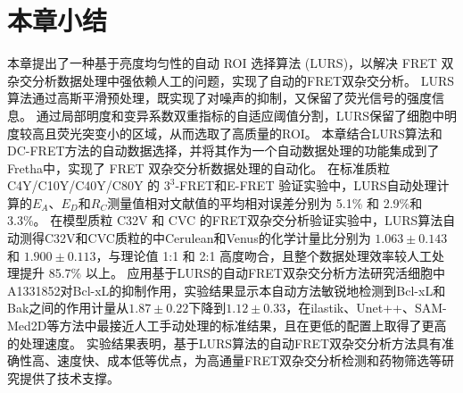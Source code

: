 \section{本章小结}
本章提出了一种基于亮度均匀性的自动 ROI 选择算法 (LURS)，以解决 FRET 双杂交分析数据处理中强依赖人工的问题，实现了自动的FRET双杂交分析。
LURS算法通过高斯平滑预处理，既实现了对噪声的抑制，又保留了荧光信号的强度信息。
通过局部明度和变异系数双重指标的自适应阈值分割，LURS保留了细胞中明度较高且荧光突变小的区域，从而选取了高质量的ROI。
本章结合LURS算法和DC-FRET方法的自动数据选择，并将其作为一个自动数据处理的功能集成到了Fretha中，实现了 FRET 双杂交分析数据处理的自动化。
在标准质粒 C4Y/C10Y/C40Y/C80Y 的 $3^3$-FRET和E-FRET 验证实验中，LURS自动处理计算的$E_A$、$E_D$和$R_C$测量值相对文献值的平均相对误差分别为 5.1\% 和 2.9\%和3.3\%。
在模型质粒 C32V 和 CVC 的FRET双杂交分析验证实验中，LURS算法自动测得C32V和CVC质粒的中Cerulean和Venus的化学计量比分别为 $1.063 \pm 0.143$ 和 $1.900 \pm 0.113$，与理论值 1:1 和 2:1 高度吻合，且整个数据处理效率较人工处理提升 85.7\% 以上。
应用基于LURS的自动FRET双杂交分析方法研究活细胞中A1331852对Bcl-xL的抑制作用，实验结果显示本自动方法敏锐地检测到Bcl-xL和Bak之间的作用计量从$1.87 \pm 0.22$下降到$1.12 \pm 0.33$，在ilastik、Unet++、SAM-Med2D等方法中最接近人工手动处理的标准结果，且在更低的配置上取得了更高的处理速度。
实验结果表明，基于LURS算法的自动FRET双杂交分析方法具有准确性高、速度快、成本低等优点，为高通量FRET双杂交分析检测和药物筛选等研究提供了技术支撑。